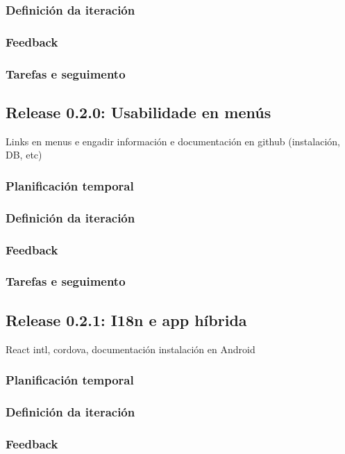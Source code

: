       \subsubsection{Definición da iteración}
      \subsubsection{Feedback}
      \subsubsection{Tarefas e seguimento}

    \subsection{Release 0.2.0: Usabilidade en menús}
    Links en menus e engadir información e documentación en github (instalación, DB, etc)
      \subsubsection{Planificación temporal}
      \subsubsection{Definición da iteración}
      \subsubsection{Feedback}
      \subsubsection{Tarefas e seguimento}

    \subsection{Release 0.2.1: I18n e app híbrida}
    React intl, cordova, documentación instalación en Android
      \subsubsection{Planificación temporal}
      \subsubsection{Definición da iteración}
      \subsubsection{Feedback}
